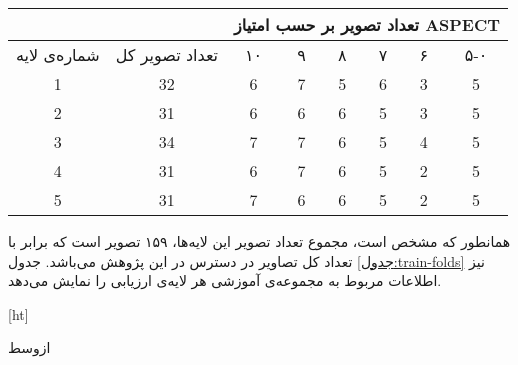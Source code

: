 \begin{tabular}{cccccccc}
    \cline{3-8}
                                                               &                                        & \multicolumn{6}{c}{تعداد تصویر بر حسب امتیاز ASPECT}                                                                                \\ \hline
     
    {شماره‌ی لایه} & تعداد تصویر کل & {۱۰} & {۹} & {۸} & {۷} & {۶} & ۵-۰ \\ \hline
    {1}                                    & 32                                     & {6}                          & {7}                         & {5}                         & {6}                         & {3}                         & 5   \\ 
    {2}                                    & 31                                     & {6}                          & {6}                         & {6}                         & {5}                         & {3}                         & 5   \\ 
    {3}                                    & 34                                     & {7}                          & {7}                         & {6}                         & {5}                         & {4}                         & 5   \\ 
    {4}                                    & 31                                     & {6}                          & {7}                         & {6}                         & {5}                         & {2}                         & 5   \\ 
    {5}                                    & 31                                     & {7}                          & {6}                         & {6}                         & {5}                         & {2}                         & 5   \\ \hline
    \end{tabular}


همانطور که مشخص است، مجموع تعداد تصویر این لایه‌ها، ۱۵۹ تصویر است که برابر با تعداد کل تصاویر در دسترس در این پژوهش می‌باشد.
جدول \ref{جدول:train-folds} نیز
اطلاعات مربوط به مجموعه‌ی آموزشی هر لایه‌ی ارزیابی را نمایش می‌دهد.

[ht]

\vspace{1.5em}

‌ازوسط

